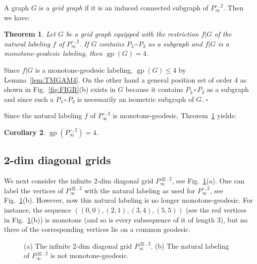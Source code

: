 \documentclass[12pt]{article}
\newtheorem{theorem}{Theorem}[section]
\newtheorem{corollary}[theorem]{Corollary}
\newcommand{\proof}{\noindent{\bf Proof.\ }}
\newcommand{\qed}{\hfill $\square$\medskip}
\def\cp{\,\square\,}
\def\sp{\,\boxtimes\,}
\DeclareMathOperator {\gp} {gp}
\begin{document}
A graph $G$ is a {\em grid graph} if it is an induced connected subgraph of $P_{\infty}^{\cp,2}$. Then we have: 

\begin{theorem}
\label{thm:special-grids}
Let $G$ be a grid graph equipped with the restriction $f|G$ of the natural labeling $f$ of $P_{\infty}^{\cp,2}$. If $G$ contains $P_3\cp P_3$ as a subgraph and $f|G$ is a monotone-geodesic labeling, then $\gp(G) = 4$. 
\end{theorem}

\proof
Since $f|G$ is a monotone-geodesic labeling, $\gp(G) \le 4$ by Lemma~\ref{lem:TMGAM4}. On the other hand a general position set of order $4$ as shown in Fig.~\ref{fig:FIGR}(b) exists in $G$ because it contains $P_3\cp P_3$ as a subgraph and since such a $P_3\cp P_3$ is necessarily an isometric subgraph of $G$.
\qed

Since the natural labeling $f$ of $P_{\infty}^{\cp,2}$ is monotone-geodesic, Theorem~\ref{thm:special-grids} yields: 

\begin{corollary}
\label{cor:TGP4IGR}
$\gp(P_{\infty}^{\cp,2}) = 4$. 
\end{corollary}

\subsection{2-dim diagonal grids}

We next consider the infinite 2-dim diagonal grid $P_{\infty}^{\sp,2}$, see Fig.~\ref{fig:FIDGR1}(a). One can label the vertices of $P_{\infty}^{\sp,2}$ with the natural labeling as used for  $P_{\infty}^{\cp,2}$, see Fig.~\ref{fig:FIDGR1}(b). However, now this natural labeling is no longer monotone-geodesic. For instance, the sequence $((0,0), (2,1), (3,4), (5,5))$ (see the red vertices in Fig.~\ref{fig:FIDGR1}(b)) is monotone (and so is every subsequence of it of length $3$), but no three of the corresponding vertices lie on a common geodesic. 
\begin{figure}[ht!]
	\begin{center}
	\end{center}
	\caption{(a) The infinite 2-dim diagonal grid $P_{\infty}^{\sp,2}$. (b) The natural labeling of $P_{\infty}^{\sp,2}$ is not monotone-geodesic.}
	\label{fig:FIDGR1}
\end{figure}
	
\end{document}
